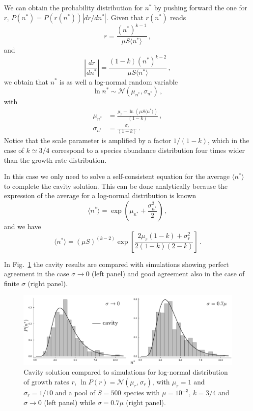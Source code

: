 \documentclass[10pt]{article}
\begin{document}
We can obtain the probability distribution for $n^*$ by pushing forward the one for $r$,
$P(n^*)=P(r(n^*))|dr/dn^*|$. Given that $r(n^*)$ reads
\begin{equation}
    r=\frac{(n^*)^{k-1}}{\mu S \langle n^* \rangle} \, ,
\end{equation}
and
\begin{equation}
    \left|\frac{dr}{dn^*}\right| = \frac{(1-k)(n^*)^{k-2}}{\mu S \langle n^* \rangle} \, ,
\end{equation}
we obtain that $n^*$ is as well a log-normal random variable
\begin{equation}
    \ln n^*\sim\mathcal N (\mu_{n^*}, \sigma_{n^*}) \, ,
    \label{eq: cavity for lognormal r}
\end{equation}
with 
\begin{align}
    \mu_{n^*} &= \frac{\mu_r - \ln{(\mu S \langle n^* \rangle)}}{(1-k)} \, , \\
    \sigma_{n^*} &= \frac{\sigma_r}{(1-k)} \, .
\end{align}
Notice that the scale parameter is amplified by a factor $1/(1-k)$, which in the
case of $k\simeq3/4$ correspond to a species abundance distribution four times
wider than the growth rate distribution.

In this case we only need to solve a self-consistent equation 
for the average $\langle n^* \rangle$ to complete the cavity solution.
This can be done analytically because the expression of the average
for a log-normal distribution is known
\begin{equation}
    \langle n^* \rangle = \exp{\left(\mu_{n^*}+\frac{\sigma_{n^*}^2}{2}\right)} \, ,
\end{equation}
and we have
\begin{equation}
    \langle n^* \rangle = (\mu S)^{(k-2)}
    \exp{\left[\frac{2\mu_r(1-k)+\sigma_r^2}{2(1-k)(2-k)}\right]} \, .
\end{equation}

In Fig.~\ref{fig: SM species abundance lognormal} the cavity results are compared with simulations showing
perfect agreement in the case $\sigma\to0$ (left panel)
and good agreement also in the case of finite $\sigma$ (right panel).

\begin{figure}[h!]
    \centering
    \includegraphics[width=1\textwidth]{fig/SM-species-abd.pdf}
    \caption{Cavity solution compared to simulations for log-normal distribution of growth rates $r$, 
    $\ln{P(r)}=\mathcal{N} (\mu_r,\sigma_r)$, with $\mu_r=1$ and $\sigma_r=1/10$
    and a pool of $S=500$ species with $\mu=10^{-3}$, $k=3/4$ and $\sigma\to0$ (left panel)
    while $\sigma=0.7\mu$ (right panel).}
    \label{fig: SM species abundance lognormal}
\end{figure}
\end{document}
